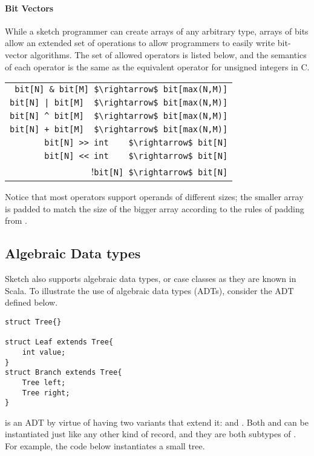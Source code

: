 \paragraph{Bit Vectors}
While a sketch programmer can create arrays of any arbitrary type, arrays of bits allow an extended set of operations to allow programmers to easily write bit-vector algorithms. The set of allowed operators is listed below, and the semantics of each operator is the same as the equivalent operator for unsigned integers in C.
\begin{center}
\begin{tabular}{r}
\lstinline!bit[N] & bit[M] $\rightarrow$ bit[max(N,M)]!\\
\lstinline!bit[N] | bit[M]  $\rightarrow$ bit[max(N,M)]!\\
\lstinline!bit[N] ^ bit[M]  $\rightarrow$ bit[max(N,M)]!\\
\lstinline!bit[N] + bit[M]  $\rightarrow$ bit[max(N,M)]!\\
\lstinline!bit[N] >> int    $\rightarrow$ bit[N]!\\
\lstinline!bit[N] << int    $\rightarrow$ bit[N]!\\
!\lstinline!bit[N] $\rightarrow$ bit[N]!\\
\end{tabular}
\end{center}

Notice that most operators support operands of different sizes; the smaller array is padded to match the size of the bigger array according to the rules of padding from .



\subsection{Algebraic Data types}
Sketch also supports algebraic data types, or case classes as they are known in Scala. To illustrate the use of algebraic data types (ADTs), consider the  ADT defined below.
\begin{lstlisting}
struct Tree{}

struct Leaf extends Tree{
	int value;
}
struct Branch extends Tree{
	Tree left;
	Tree right;
}
\end{lstlisting}
 is an ADT by virtue of having two variants that extend it:  and . Both  and  can be instantiated just like any other kind of record, and they are both subtypes of . For example, the code below instantiates a small tree.


